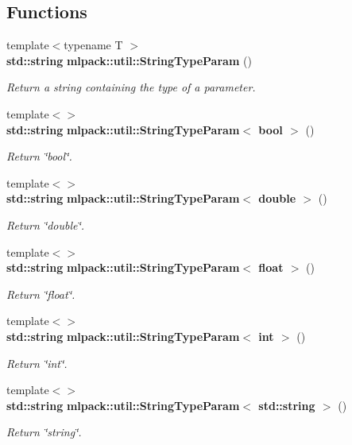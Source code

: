 \subsection*{Functions}
\begin{DoxyCompactItemize}
\item 
{\footnotesize template$<$typename T $>$ }\\{\bf std\+::string} {\bf mlpack\+::util\+::\+String\+Type\+Param} ()
\begin{DoxyCompactList}\small\item\em Return a string containing the type of a parameter. \end{DoxyCompactList}\item 
{\footnotesize template$<$$>$ }\\{\bf std\+::string} {\bf mlpack\+::util\+::\+String\+Type\+Param$<$ bool $>$} ()
\begin{DoxyCompactList}\small\item\em Return \char`\"{}bool\char`\"{}. \end{DoxyCompactList}\item 
{\footnotesize template$<$$>$ }\\{\bf std\+::string} {\bf mlpack\+::util\+::\+String\+Type\+Param$<$ double $>$} ()
\begin{DoxyCompactList}\small\item\em Return \char`\"{}double\char`\"{}. \end{DoxyCompactList}\item 
{\footnotesize template$<$$>$ }\\{\bf std\+::string} {\bf mlpack\+::util\+::\+String\+Type\+Param$<$ float $>$} ()
\begin{DoxyCompactList}\small\item\em Return \char`\"{}float\char`\"{}. \end{DoxyCompactList}\item 
{\footnotesize template$<$$>$ }\\{\bf std\+::string} {\bf mlpack\+::util\+::\+String\+Type\+Param$<$ int $>$} ()
\begin{DoxyCompactList}\small\item\em Return \char`\"{}int\char`\"{}. \end{DoxyCompactList}\item 
{\footnotesize template$<$$>$ }\\{\bf std\+::string} {\bf mlpack\+::util\+::\+String\+Type\+Param$<$ std\+::string $>$} ()
\begin{DoxyCompactList}\small\item\em Return \char`\"{}string\char`\"{}. \end{DoxyCompactList}\item 

\end{DoxyCompactItemize}
